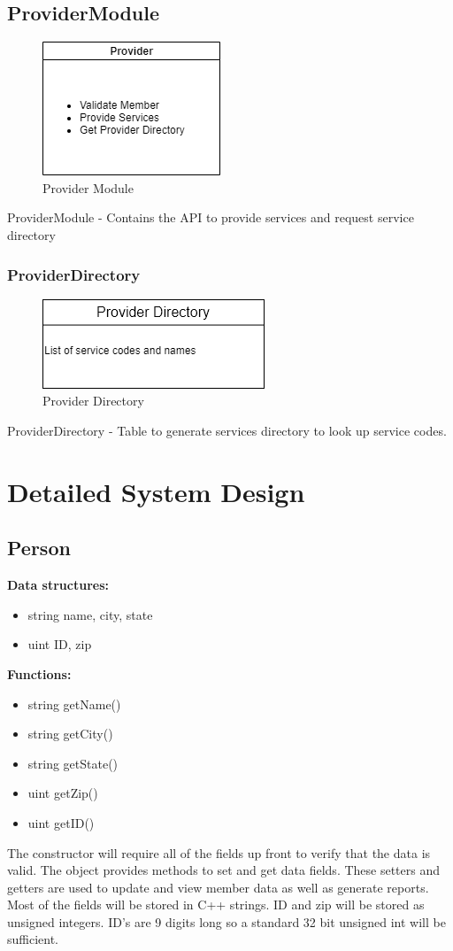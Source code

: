 \documentclass{article}
\begin{document}
\subsection{ProviderModule}
  \begin{figure}[h!]
	\centering
	\includegraphics[width=0.3\linewidth]{providerModule.png}
	\caption[Provider Module]{Provider Module}
	\label{fig:P1compileP0-1}
  \end{figure}
ProviderModule - Contains the API to provide services and request service directory
\subsubsection{ProviderDirectory}
  \begin{figure}[h!]
	\centering
	\includegraphics[width=0.3\linewidth]{providerDirectory.png}
	\caption[Provider Directory]{Provider Directory}
	\label{fig:P1compileP0-1}
  \end{figure}
ProviderDirectory - Table to generate services directory to look up service codes.

\section{Detailed System Design}
\subsection{Person}
\textbf{Data structures:}
\begin{itemize}
   \item string name, city, state
   \item uint ID, zip
\end{itemize}
\textbf{Functions:}
\begin{itemize}
   \item string getName()
   \item string getCity()
   \item string getState()
   \item uint getZip()
   \item uint getID()
\end{itemize}
The constructor will require all of the fields up front to verify that the data is valid. The object provides methods to set and get data fields. These setters and getters are used to update and view member data as well as generate reports. Most of the fields will be stored in C++ strings. ID and zip will be stored as unsigned integers. ID’s are 9 digits long so a standard 32 bit unsigned int will be sufficient.
\end{document}
